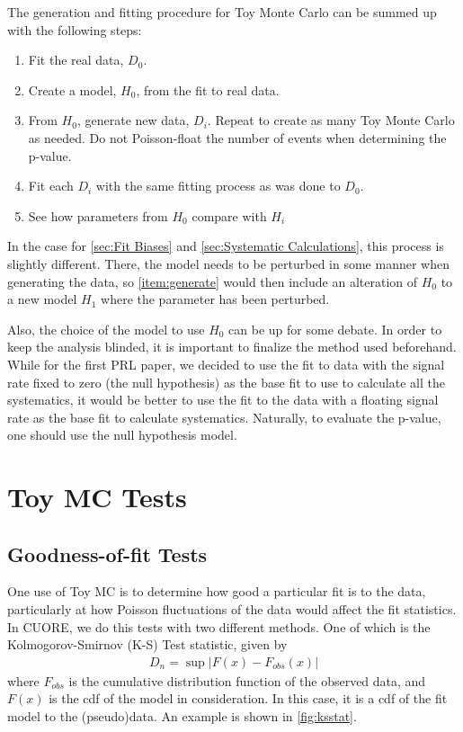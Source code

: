 The generation and fitting procedure for Toy Monte Carlo can be summed up with the following steps:
\begin{enumerate}
\item Fit the real data, $D_0$.
\item Create a model, $H_0$, from the fit to real data.
\item \label{item:generate} From $H_0$, generate new data, $D_i$. Repeat to create as many Toy Monte Carlo as needed. Do not Poisson-float the number of events when determining the p-value.
\item Fit each $D_i$ with the same fitting process as was done to $D_0$.
\item See how parameters from $H_0$ compare with $H_i$
\end{enumerate}

In the case for \autoref{sec:Fit Biases} and \autoref{sec:Systematic Calculations}, this process is slightly different. There, the model needs to be perturbed in some manner when generating the data, so \autoref{item:generate} would then include an alteration of $H_0$ to a new model $H_1$ where the parameter has been perturbed.

Also, the choice of the model to use $H_0$ can be up for some debate. In order to keep the analysis blinded, it is important to finalize the method used beforehand. While for the first PRL paper, we decided to use the fit to data with the signal rate fixed to zero (the null hypothesis) as the base fit to use to calculate all the systematics, it would be better to use the fit to the data with a floating signal rate as the base fit to calculate systematics. Naturally, to evaluate the p-value, one should use the null hypothesis model.


\section{Toy MC Tests}
\subsection*{Goodness-of-fit Tests}
\label{sec:Goodness-of-fit}
One use of Toy MC is to determine how good a particular fit is to the data, particularly at how Poisson fluctuations of the data would affect the fit statistics.
In CUORE, we do this tests with two different methods. One of which is the Kolmogorov-Smirnov (K-S) Test statistic, given by
\begin{eqnarray}
D_n = \sup|F(x) - F_{obs}(x)| 
\end{eqnarray}
where $F_{obs}$ is the cumulative distribution function of the observed data, and $F(x)$ is the cdf of the model in consideration. In this case, it is a cdf of the fit model to the (pseudo)data. An example is shown in \autoref{fig:ksstat}.


